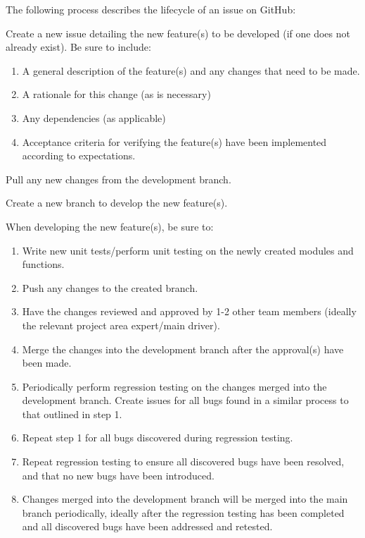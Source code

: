 \documentclass{article}
\begin{document}
\noindent The following process describes the lifecycle of an issue on GitHub:

\begin{enumerate}
\begin{item}
Create a new issue detailing the new feature(s) to be developed (if one does not already exist). Be sure to include:
\begin{enumerate}
\item A general description of the feature(s) and any changes that need to be made.
\item A rationale for this change (as is necessary)
\item Any dependencies (as applicable)
\item Acceptance criteria for verifying the feature(s) have been implemented according to expectations.
\end{enumerate}
\end{item}
\begin{item}
Pull any new changes from the development branch.
\end{item}
\begin{item}
Create a new branch to develop the new feature(s).
\end{item}
\begin{item}
When developing the new feature(s), be sure to:
\begin{enumerate}
\item Write new unit tests/perform unit testing on the newly created modules and functions.
\item Push any changes to the created branch.
\item Have the changes reviewed and approved by 1-2 other team members (ideally the relevant project area expert/main driver).
\item Merge the changes into the development branch after the approval(s) have been made.
\item Periodically perform regression testing on the changes merged into the development branch. Create issues for all bugs found in a similar process to that outlined in step 1.
\item Repeat step 1 for all bugs discovered during regression testing.
\item Repeat regression testing to ensure all discovered bugs have been resolved, and that no new bugs have been introduced.
\item Changes merged into the development branch will be merged into the main branch periodically, ideally after the regression testing has been completed and all discovered bugs have been addressed and retested.
\end{enumerate}
\end{item}
\end{enumerate}
 
\end{document}
